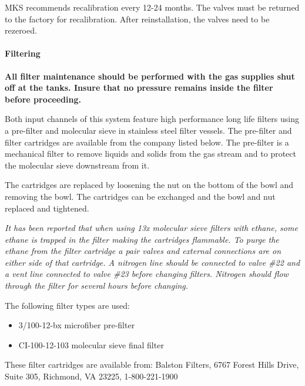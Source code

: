 
MKS recommends recalibration every 12-24 months.  The valves must be
returned to the factory for recalibration.  After reinstallation, the
valves need to be rezeroed.

\paragraph{Filtering}

{\bf All filter maintenance should be performed with the gas supplies shut off
at the tanks.  Insure that no pressure remains inside the filter
before proceeding.}

Both input channels of this system feature high performance long life
filters using a pre-filter and molecular sieve in stainless steel filter
vessels.  The pre-filter and filter cartridges are available from the
company listed below.  The pre-filter is a mechanical filter to remove
liquids and solids from the gas stream and to protect the molecular sieve
downstream from it.


The cartridges are replaced by loosening the nut on the bottom of the bowl
and removing the bowl.  The cartridges can be exchanged and the bowl and
nut replaced and tightened.


{\sl It has been reported that when using 13x molecular sieve filters with
ethane, some ethane is trapped in the filter making the cartridges
flammable.   To purge the ethane from the  filter cartridge a pair valves
and external connections are on either side of that cartridge.  A nitrogen
line should be connected to valve \#22 and a vent line connected to valve
\#23 before changing filters. Nitrogen should flow through the filter for
several hours before changing.}


The following filter types are used:
\begin{itemize}
\item[~]3/100-12-bx microfiber pre-filter
\item[~]CI-100-12-103 molecular sieve final filter
\end{itemize}

These filter cartridges are available from:  Balston Filters, 6767 Forest Hills Drive, Suite 305, Richmond, VA 23225,  1-800-221-1900

